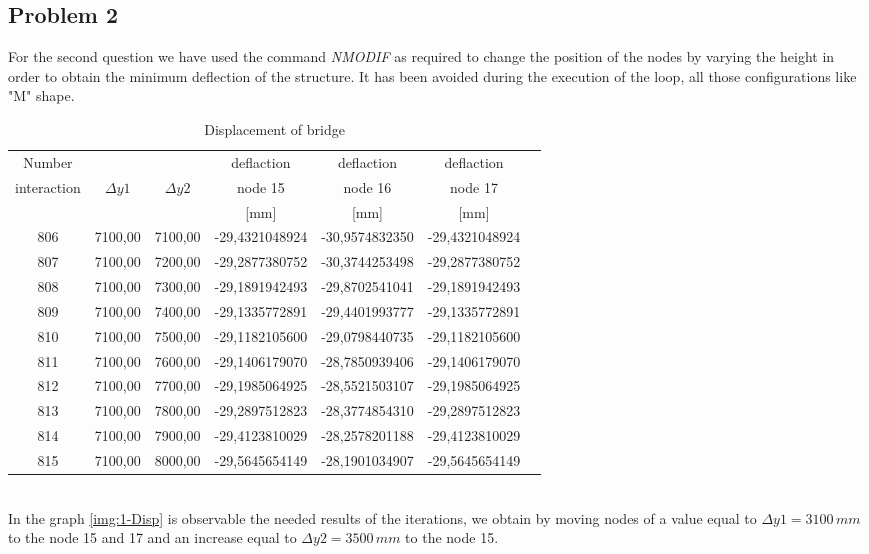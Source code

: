 \subsection{Problem 2}
For the second question we have used the command \textsc{\emph{NMODIF}} as required to change the position of the nodes by varying the height in order to obtain the minimum deflection of the structure. It has been avoided during the execution of the loop, all those configurations like "M" shape.
\begin{table}[h]
\centering
\footnotesize
\begin{tabular}{ccccccc}
\hline
Number	  & 					  &					  &deflaction & deflaction & deflaction\\
interaction & $\Delta y1$ & $\Delta y2$ &  node 15    &  node 16  & node 17\\
				  &					  &					  & [mm]       & [mm]       & [mm]\\
\hline
806 &   7100,00 &   7100,00 &   -29,4321048924 &   -30,9574832350 &   -29,4321048924\\
807 &   7100,00 &   7200,00 &   -29,2877380752 &   -30,3744253498 &   -29,2877380752\\
808 &   7100,00 &   7300,00 &   -29,1891942493 &   -29,8702541041 &   -29,1891942493\\
809 &   7100,00 &   7400,00 &   -29,1335772891 &   -29,4401993777 &   -29,1335772891\\
\color{red}810 &\color{red}   7100,00 &\color{red}   7500,00 & \color{red}  -29,1182105600 &  \color{red} -29,0798440735 &\color{red}   -29,1182105600\\
811 &   7100,00 &   7600,00 &   -29,1406179070 &   -28,7850939406 &   -29,1406179070\\
812 &   7100,00 &   7700,00 &   -29,1985064925 &   -28,5521503107 &   -29,1985064925\\
813 &   7100,00 &   7800,00 &   -29,2897512823 &   -28,3774854310 &   -29,2897512823\\
814 &   7100,00 &   7900,00 &   -29,4123810029 &   -28,2578201188 &   -29,4123810029\\
815 &   7100,00 &   8000,00 &   -29,5645654149 &   -28,1901034907 &   -29,5645654149\\
\hline
\end{tabular}
\caption{Displacement of bridge}
\label{tab:WH1-Disp}
\end{table}\\\pagebreak
\newpage
\noindent In the graph \ref{img:1-Disp} is observable the needed results of the iterations, we obtain by moving nodes of a value equal to $\Delta y1 = 3100 \, mm$ to the node 15 and 17 and an increase equal to $\Delta y2 = 3500 \, mm$ to the node 15.\\
